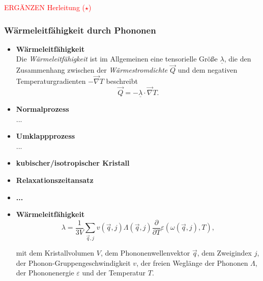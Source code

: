 \documentclass{article}
\begin{document}
\textcolor{red}{ERGÄNZEN Herleitung ($\star$)}


\newpage


\subsubsection{Wärmeleitfähigkeit durch Phononen}
	\begin{itemize}
		\item \textbf{Wärmeleitfähigkeit}\\
		Die \textit{Wärmeleitfähigkeit} ist im Allgemeinen eine tensorielle Größe $\underline{\lambda}$, die den Zusammenhang zwischen der \textit{Wärmestromdichte} $\vec{Q}$ und dem negativen Temperaturgradienten $-\vec{\nabla}T$ beschreibt
			\begin{equation}
				\vec{Q} = -\underline{\lambda} \cdot \vec{\nabla} T.
			\end{equation}
			
		
		\item \textbf{Normalprozess}\\
		...
		
		
		\item \textbf{Umklappprozess}\\
		...
	\end{itemize}


	\begin{itemize}
		\item \textbf{kubischer/isotropischer Kristall}
		
		
		\item \textbf{Relaxationszeitansatz}
		
		
		\item \textbf{...}
	\end{itemize}


	\begin{itemize}
		\item \textbf{Wärmeleitfähigkeit}
			\begin{equation}
				\lambda = \frac{1}{3V} \sum_{\vec{q},j} v(\vec{q},j) \Lambda(\vec{q},j) \frac{\partial}{\partial T} \varepsilon(\omega(\vec{q},j),T),
			\end{equation}
			
		mit dem Kristallvolumen $V$, dem Phononenwellenvektor $\vec{q}$, dem Zweigindex $j$, der Phonon-Gruppengeschwindigkeit $v$, der freien Weglänge der Phononen $\Lambda$, der Phononenergie $\varepsilon$ und der Temperatur $T$.
		
		
	\end{itemize}
\end{document}
